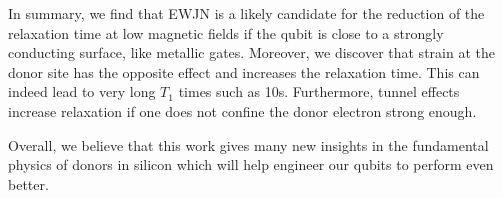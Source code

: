 In summary, we find that EWJN is a likely candidate for the reduction of the relaxation time at low magnetic fields if the qubit is close to a strongly conducting surface, like metallic gates. Moreover, we discover that strain at the donor site has the opposite effect and increases the relaxation time. This can indeed lead to very long $T_1$ times such as 10s. Furthermore, tunnel effects increase relaxation if one does not confine the donor electron strong enough. 

Overall, we believe that this work gives many new insights in the fundamental physics of donors in silicon which will help engineer our qubits to perform even better.  





